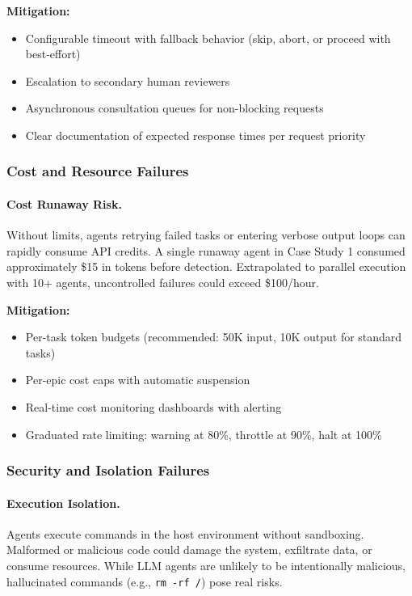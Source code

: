 \textbf{Mitigation:}
\begin{itemize}
    \item Configurable timeout with fallback behavior (skip, abort, or
    proceed with best-effort)
    \item Escalation to secondary human reviewers
    \item Asynchronous consultation queues for non-blocking requests
    \item Clear documentation of expected response times per request priority
\end{itemize}

\subsubsection{Cost and Resource Failures}
\label{subsubsec:cost-resource-detail}

\paragraph{Cost Runaway Risk.}
Without limits, agents retrying failed tasks or entering verbose output
loops can rapidly consume API credits. A single runaway agent in Case Study 1
consumed approximately \$15 in tokens before detection. Extrapolated to
parallel execution with 10+ agents, uncontrolled failures could exceed
\$100/hour.

\textbf{Mitigation:}
\begin{itemize}
    \item Per-task token budgets (recommended: 50K input, 10K output for
    standard tasks)
    \item Per-epic cost caps with automatic suspension
    \item Real-time cost monitoring dashboards with alerting
    \item Graduated rate limiting: warning at 80\%, throttle at 90\%, halt
    at 100\%
\end{itemize}

\needspace{4cm}
\subsubsection{Security and Isolation Failures}
\label{subsubsec:security-isolation-detail}

\paragraph{Execution Isolation.}
Agents execute commands in the host environment without sandboxing.
Malformed or malicious code could damage the system, exfiltrate data,
or consume resources. While LLM agents are unlikely to be intentionally
malicious, hallucinated commands (e.g., \texttt{rm -rf /}) pose real risks.

